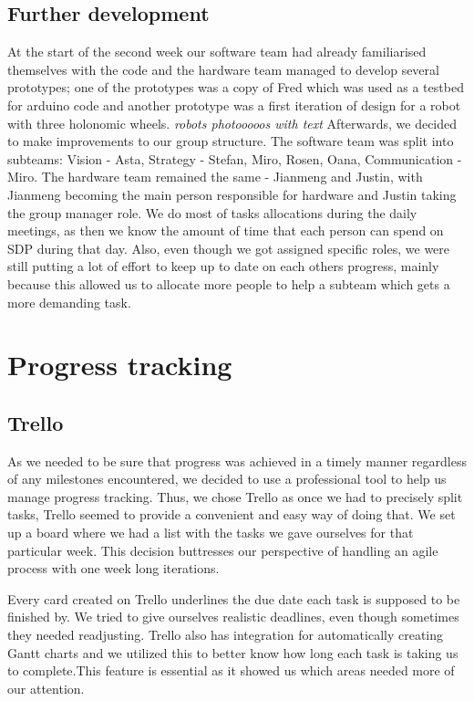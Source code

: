 \documentclass[12pt,oneside]{article}
\begin{document}
	\subsection{Further development}
		At the start of the second week our software team had already familiarised themselves with the code and the hardware team managed to develop several prototypes; one of the prototypes was a copy of Fred which was used as a testbed for arduino code and another prototype was a first iteration of design for a robot with three holonomic wheels.
		\newline
		\emph{robots photooooos with text}
		\newline
		Afterwards, we decided to make improvements to our group structure. The software team was split into subteams: Vision - Asta, Strategy - Stefan, Miro, Rosen, Oana, Communication - Miro. The hardware team remained the same - Jianmeng and Justin, with Jianmeng becoming the main person responsible for hardware and Justin taking the group manager role. We do most of tasks allocations during the daily meetings, as then we know the amount of time that each person can spend on SDP during that day. Also, even though we got assigned specific roles, we were still putting a lot of effort to keep up to date on each others progress, mainly because this allowed us to allocate more people to help a subteam which gets a more demanding task.
	\section{Progress tracking}
	\subsection{Trello}
		As we needed to be sure that progress was achieved in a timely manner regardless of any milestones encountered, we decided to use a professional tool to help us manage progress tracking. Thus, we chose Trello as once we had to precisely split tasks, Trello seemed to provide a convenient and easy way of doing that. We set up a board where we had a list with the tasks we gave ourselves for that particular week. This decision  buttresses our perspective of handling an agile process with one week long iterations. 
		
		Every card created on Trello underlines the due date each task is supposed to be finished by. We tried to give ourselves realistic deadlines, even though sometimes they needed readjusting. Trello also has integration for automatically creating Gantt charts and we utilized this to better know how long each task is taking us to complete.This feature is essential as it showed us which areas needed more of our attention.
		
\end{document}
